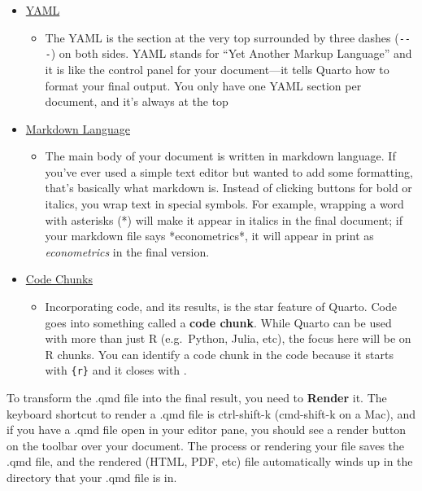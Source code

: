 \documentclass[
  letterpaper,
]{book}
\providecommand{\tightlist}{%
  \setlength{\itemsep}{0pt}\setlength{\parskip}{0pt}}\usepackage{longtable,booktabs,array}
\begin{document}
\begin{itemize}
\item
  \hyperref[yaml]{YAML}

  \begin{itemize}
  \tightlist
  \item
    The YAML is the section at the very top surrounded by three dashes
    (\texttt{-\/-\/-}) on both sides. YAML stands for ``Yet Another
    Markup Language'' and it is like the control panel for your
    document---it tells Quarto how to format your final output. You only
    have one YAML section per document, and it's always at the top
  \end{itemize}
\item
  \hyperref[markdown-language]{Markdown Language}

  \begin{itemize}
  \tightlist
  \item
    The main body of your document is written in markdown language. If
    you've ever used a simple text editor but wanted to add some
    formatting, that's basically what markdown is. Instead of clicking
    buttons for bold or italics, you wrap text in special symbols. For
    example, wrapping a word with asterisks (*) will make it appear in
    italics in the final document; if your markdown file says
    *econometrics*, it will appear in print as \emph{econometrics} in
    the final version.
  \end{itemize}
\item
  \hyperref[code-chunks]{Code Chunks}

  \begin{itemize}
  \tightlist
  \item
    Incorporating code, and its results, is the star feature of Quarto.
    Code goes into something called a \textbf{code chunk}. While Quarto
    can be used with more than just R (e.g.~Python, Julia, etc), the
    focus here will be on R chunks. You can identify a code chunk in the
    code because it starts with
    \texttt{\textasciigrave{}\textasciigrave{}\textasciigrave{}\{r\}}
    and it closes with
    \texttt{\textasciigrave{}\textasciigrave{}\textasciigrave{}}.
  \end{itemize}
\end{itemize}

To transform the .qmd file into the final result, you need to
\textbf{Render} it. The keyboard shortcut to render a .qmd file is
ctrl-shift-k (cmd-shift-k on a Mac), and if you have a .qmd file open in
your editor pane, you should see a render button on the toolbar over
your document. The process or rendering your file saves the .qmd file,
and the rendered (HTML, PDF, etc) file automatically winds up in the
directory that your .qmd file is in.
\end{document}

